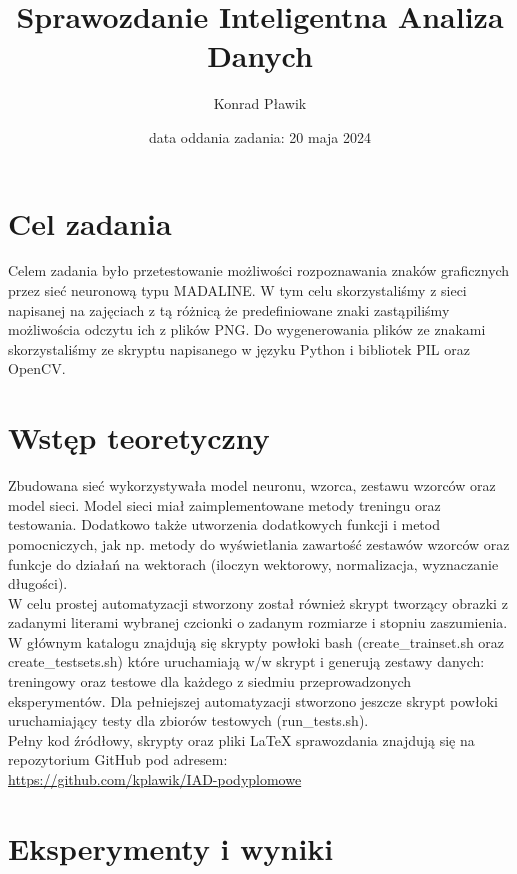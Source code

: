 \documentclass[12pt]{article}
\title{{\bf Sprawozdanie}\linebreak
Inteligentna Analiza Danych}
\author{Konrad Pławik}
\date{data oddania zadania: 20 maja 2024}
\begin{document}
\clearpage\maketitle
\thispagestyle{empty}
\newpage
\setcounter{page}{1}
\section{Cel zadania}

Celem zadania było przetestowanie możliwości rozpoznawania znaków graficznych przez sieć neuronową 
typu MADALINE. W tym celu skorzystaliśmy z sieci napisanej na zajęciach z tą różnicą że predefiniowane znaki zastąpiliśmy możliwościa odczytu ich z plików PNG. Do wygenerowania plików ze znakami skorzystaliśmy ze skryptu napisanego w języku Python i bibliotek PIL oraz OpenCV.\\

\section{Wstęp teoretyczny}

Zbudowana sieć wykorzystywała model neuronu, wzorca, zestawu wzorców oraz model sieci. Model sieci miał zaimplementowane metody treningu oraz testowania. Dodatkowo także utworzenia dodatkowych funkcji i metod pomocniczych, jak np. metody do wyświetlania zawartość zestawów wzorców oraz funkcje do działań na wektorach (iloczyn wektorowy, normalizacja, wyznaczanie długości).\\

\noindent
W celu prostej automatyzacji stworzony został również skrypt tworzący obrazki z zadanymi literami wybranej czcionki o zadanym rozmiarze i stopniu zaszumienia. W głównym katalogu znajdują się skrypty powłoki bash (create\_trainset.sh oraz create\_testsets.sh) które uruchamiają w/w skrypt i generują zestawy danych: treningowy oraz testowe dla każdego z siedmiu przeprowadzonych eksperymentów. Dla pełniejszej automatyzacji stworzono jeszcze skrypt powłoki uruchamiający testy dla zbiorów testowych (run\_tests.sh).\\

\noindent
Pełny kod źródłowy, skrypty oraz pliki LaTeX sprawozdania znajdują się na repozytorium GitHub pod adresem: \\

\url{https://github.com/kplawik/IAD-podyplomowe}

\section{Eksperymenty i wyniki}
\end{document}
